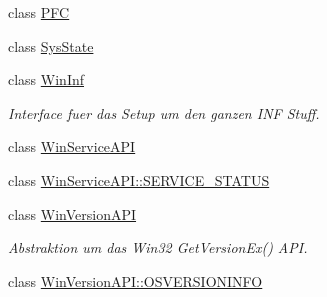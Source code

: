 \begin{CompactItemize}
class \hyperlink{classQbeSAS_1_1PFC}{PFC}
\item 
class \hyperlink{classQbeSAS_1_1SysState}{Sys\-State}
\item 
class \hyperlink{classQbeSAS_1_1WinInf}{Win\-Inf}
\begin{CompactList}\small\item\em Interface fuer das Setup um den ganzen INF Stuff. \item\end{CompactList}\item 
class \hyperlink{classQbeSAS_1_1WinServiceAPI}{Win\-Service\-API}
\item 
class \hyperlink{classQbeSAS_1_1WinServiceAPI_1_1SERVICE__STATUS}{Win\-Service\-API::SERVICE\_\-STATUS}
\item 
class \hyperlink{classQbeSAS_1_1WinVersionAPI}{Win\-Version\-API}
\begin{CompactList}\small\item\em Abstraktion um das Win32 Get\-Version\-Ex() API. \item\end{CompactList}\item 
class \hyperlink{classQbeSAS_1_1WinVersionAPI_1_1OSVERSIONINFO}{Win\-Version\-API::OSVERSIONINFO}
\end{CompactItemize}
